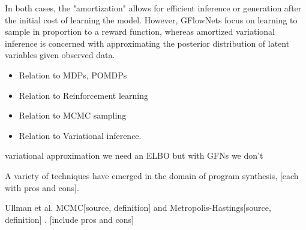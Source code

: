 In both cases, the "amortization" allows for efficient inference or generation after the initial cost of learning the model. However, GFlowNets focus on learning to sample in proportion to a reward function, whereas amortized variational inference is concerned with approximating the posterior distribution of latent variables given observed data.

\begin{itemize}
    \item Relation to MDPs, POMDPs
    \item Relation to Reinforcement learning
    \item Relation to MCMC sampling
    \item Relation to Variational inference. 
\end{itemize}


variational approximation we need an ELBO but with GFNs we don't 

A variety of techniques have emerged in the domain of program synthesis, [each with pros and cons].

Ullman et al. MCMC[source, definition] and Metropolis-Hastings[source, definition] \cite{ullman_theory_2012}. [include pros and cons]







